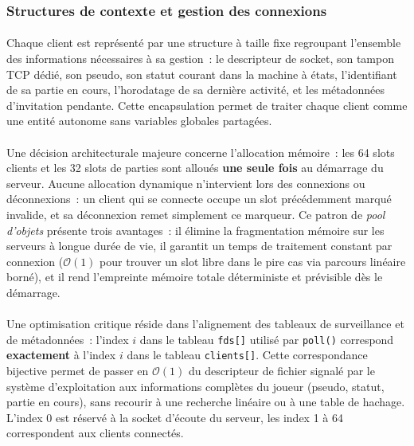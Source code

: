 \documentclass[a4paper]{article}
\begin{document}
\subsubsection{Structures de contexte et gestion des connexions}
\label{subsec:context-structures}
 
\paragraph{}
Chaque client est représenté par une structure à taille fixe regroupant
l'ensemble des informations nécessaires à sa gestion~: le descripteur de
socket, son tampon TCP dédié, son pseudo, son statut courant dans la machine
à états, l'identifiant de sa
partie en cours, l'horodatage de sa dernière activité, et les métadonnées
d'invitation pendante. Cette encapsulation permet de traiter chaque client
comme une entité autonome sans variables globales partagées.
 
\paragraph{}
Une décision architecturale majeure concerne l'allocation mémoire~: les 64
slots clients et les 32 slots de parties sont alloués \textbf{une seule fois}
au démarrage du serveur. Aucune allocation dynamique n'intervient lors des
connexions ou déconnexions~: un client qui se connecte occupe un slot
précédemment marqué invalide, et sa déconnexion remet simplement ce marqueur.
Ce patron de \textit{pool d'objets} présente trois avantages~: il élimine
la fragmentation mémoire sur les serveurs à longue durée de vie, il garantit
un temps de traitement constant par connexion ($\mathcal{O}(1)$ pour trouver
un slot libre dans le pire cas via parcours linéaire borné), et il rend
l'empreinte mémoire totale déterministe et prévisible dès le démarrage.
 
\paragraph{}
Une optimisation critique réside dans l'alignement des tableaux de surveillance
et de métadonnées~: l'index $i$ dans le tableau \texttt{fds[]} utilisé par
\texttt{poll()} correspond \textbf{exactement} à l'index $i$ dans le tableau
\texttt{clients[]}. Cette correspondance bijective permet de passer en
$\mathcal{O}(1)$ du descripteur de fichier signalé par le système d'exploitation
aux informations complètes du joueur (pseudo, statut, partie en cours), sans
recourir à une recherche linéaire ou à une table de hachage. L'index 0 est
réservé à la socket d'écoute du serveur, les index 1 à 64 correspondent aux
clients connectés.
\end{document}
